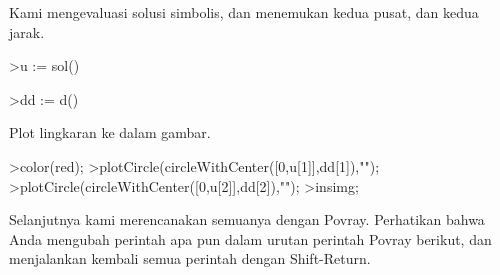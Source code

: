 \documentclass[a4paper,10pt]{article}
\begin{document}
\begin{eulernotebook}
\begin{eulercomment}
\begin{eulercomment}
\begin{eulercomment}
Kami mengevaluasi solusi simbolis, dan menemukan kedua pusat, dan
kedua jarak.
\end{eulercomment}
\begin{eulerprompt}
>u := sol()
\end{eulerprompt}
\begin{euleroutput}
  [0.333333,  1]
\end{euleroutput}
\begin{eulerprompt}
>dd := d()
\end{eulerprompt}
\begin{euleroutput}
  [0.149071,  0.447214]
\end{euleroutput}
\begin{eulercomment}
Plot lingkaran ke dalam gambar.
\end{eulercomment}
\begin{eulerprompt}
>color(red);
>plotCircle(circleWithCenter([0,u[1]],dd[1]),"");
>plotCircle(circleWithCenter([0,u[2]],dd[2]),"");
>insimg;
\end{eulerprompt}
\begin{eulercomment}
Selanjutnya kami merencanakan semuanya dengan Povray. Perhatikan bahwa
Anda mengubah perintah apa pun dalam urutan perintah Povray berikut,
dan menjalankan kembali semua perintah dengan Shift-Return.


\end{eulercomment}
\end{eulercomment}
\end{eulercomment}
\end{eulernotebook}
\end{document}
